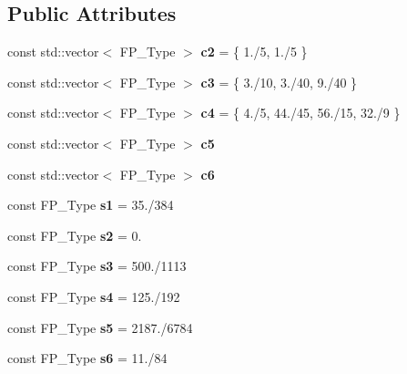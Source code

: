 \subsection*{Public Attributes}
\begin{DoxyCompactItemize}
\item 
\mbox{\label{classBlackbox_a0a9ceb8a67769f231b2c958fd1205042}} 
const std\+::vector$<$ F\+P\+\_\+\+Type $>$ {\bfseries c2} = \{ 1./5, 1./5 \}
\item 
\mbox{\label{classBlackbox_ac1b78c2e2779213a170e072a41de9221}} 
const std\+::vector$<$ F\+P\+\_\+\+Type $>$ {\bfseries c3} = \{ 3./10, 3./40, 9./40 \}
\item 
\mbox{\label{classBlackbox_a2064bec0552fd00792c4da06e58fbae6}} 
const std\+::vector$<$ F\+P\+\_\+\+Type $>$ {\bfseries c4} = \{ 4./5, 44./45, 56./15, 32./9 \}
\item 
const std\+::vector$<$ F\+P\+\_\+\+Type $>$ {\bfseries c5}
\item 
const std\+::vector$<$ F\+P\+\_\+\+Type $>$ {\bfseries c6}
\item 
\mbox{\label{classBlackbox_ae46f4feda59f07bf81903aeac86c676e}} 
const F\+P\+\_\+\+Type {\bfseries s1} = 35./384
\item 
\mbox{\label{classBlackbox_a3aa11889d818436218abae74cf49db4b}} 
const F\+P\+\_\+\+Type {\bfseries s2} = 0.
\item 
\mbox{\label{classBlackbox_ab8a7838aef85aa6c0887a38dbee9fce0}} 
const F\+P\+\_\+\+Type {\bfseries s3} = 500./1113
\item 
\mbox{\label{classBlackbox_ada127477d1f1d03dd6a7fd543f732c22}} 
const F\+P\+\_\+\+Type {\bfseries s4} = 125./192
\item 
\mbox{\label{classBlackbox_a45e3904b06f05528997a4af65e2ea48a}} 
const F\+P\+\_\+\+Type {\bfseries s5} = 2187./6784
\item 
\mbox{\label{classBlackbox_a5ad4004f7c0f525752bb852f60200f75}} 
const F\+P\+\_\+\+Type {\bfseries s6} = 11./84
\end{DoxyCompactItemize}



